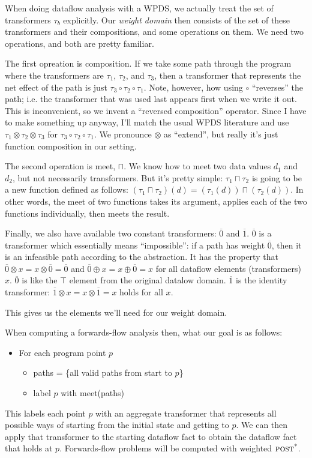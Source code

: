 \documentclass{article}
\newcommand{\meet}{\sqcap}
\newcommand{\extend}{\otimes}
\newcommand{\combine}{\oplus}
\newcommand{\poststar}{\ensuremath{\textsc{post}^\textsc{*}}}
\newcommand{\Zero}{\ensuremath{\overline{0}}}
\newcommand{\One}{\ensuremath{\overline{1}}}
\begin{document}
When doing dataflow analysis with a WPDS, we actually treat the set of
transformers $\tau_b$ explicitly. Our \emph{weight domain} then
consists of the set of these transformers and their compositions, and
some operations on them. We need two operations, and both are pretty
familiar.

The first opreation is composition. If we take some path through the
program where the transformers are $\tau_1$, $\tau_2$, and $\tau_3$,
then a transformer that represents the net effect of the path is just
$\tau_3 \circ \tau_2 \circ \tau_1$. Note, however, how using $\circ$
``reverses'' the path; i.e. the transformer that was used last appears
first when we write it out. This is inconvenient, so we invent a
``reversed composition'' operator. Since I have to make something up
anyway, I'll match the usual WPDS literature and use $\tau_1 \extend
\tau_2 \extend \tau_3$ for $\tau_3 \circ \tau_2 \circ \tau_1$. We
pronounce $\extend$ as ``extend'', but really it's just function
composition in our setting.

The second operation is meet, $\meet$. We know how to meet two data
values $d_1$ and $d_2$, but not necessarily transformers. But it's
pretty simple: $\tau_1 \meet \tau_2$ is going to be a new function
defined as follows: $(\tau_1 \meet \tau_2)(d) = (\tau_1(d)) \meet
(\tau_2(d))$. In other words, the meet of two functions takes its
argument, applies each of the two functions individually, then meets
the result.

Finally, we also have available two constant transformers: $\Zero$ and
$\One$. $\Zero$ is a transformer which essentially means
``impossible'': if a path has weight $\Zero$, then it is an infeasible
path according to the abstraction. It has the property that $\Zero
\extend x = x \extend \Zero = \Zero$ and $\Zero \combine x = x
\combine \Zero = x$ for all dataflow elements (transformers)
$x$. $\Zero$ is like the $\top$ element from the original datalow
domain. $\One$ is the identity transformer: $\One \extend x = x
\extend \One = x$ holds for all $x$.

This gives us the elements we'll need for our weight domain. 

When computing a forwards-flow analysis then, what our goal is as
follows:
\begin{itemize}
\item For each program point $p$
  \begin{itemize}
    \item paths = \{all valid paths from start to $p$\}
    \item label $p$ with meet(paths)
  \end{itemize}
\end{itemize}
This labels each point $p$ with an aggregate transformer that
represents all possible ways of starting from the initial state and
getting to $p$. We can then apply that transformer to the starting
dataflow fact to obtain the dataflow fact that holds at
$p$. Forwards-flow problems will be computed with weighted \poststar.
\end{document}
